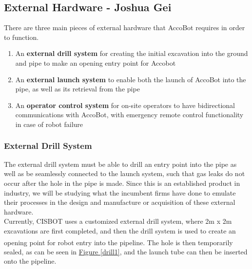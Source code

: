 \documentclass[11pt]{article}		%
\newcommand{\supercite}[1]{\textsuperscript{\cite{#1}}}		%
\newcommand{\figref}[1]{\hyperref[#1]{Figure \ref*{#1}}}    %
\begin{document}
		\subsection[External Hardware]{External Hardware - Joshua Gei}
		There are three main pieces of external hardware that AccoBot requires in order to function. 
        \begin{enumerate}
        \item An \textbf{external drill system} for creating the initial excavation into the ground and pipe to make an opening entry point for Accobot
        \item An \textbf{external launch system} to enable both the launch of AccoBot into the pipe, as well as its retrieval from the pipe
        \item An \textbf{operator control system} for on-site operators to have bidirectional communications with AccoBot, with emergency remote control functionality in case of robot failure
        \end{enumerate}
		
		\subsubsection{External Drill System}
		The external drill system must be able to drill an entry point into the pipe as well as be seamlessly connected to the launch system, such that gas leaks do not occur after the hole in the pipe is made. Since this is an established product in industry, we will be studying what the incumbent firms have done to emulate their processes in the design and manufacture or acquisition of these external hardware.
        \\ \hspace*{3ex}Currently, CISBOT uses a customized external drill system, where 2m x 2m excavations are first completed, and then the drill system is used to create an opening point for robot entry into the pipeline\supercite{cisbotdrill}. The hole is then temporarily sealed, as can be seen in \figref{drill1}, and the launch tube can then be inserted onto the pipeline. 
        
\end{document}

